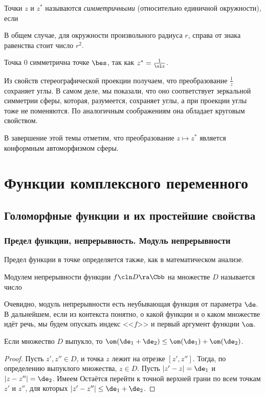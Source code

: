 \documentclass[a4paper]{article}
\begin{document}
\begin{df}
Точки $z$ и $z^*$ называются \emph{симметричными} (относительно единичной окружности),
если
\end{df}

В общем случае, для окружности произвольного радиуса $r$, справа от знака равенства стоит число $r^2$.

Точка $0$ симметрична точке $\bes$, так как $z^* = \frac{1}{\ol z}$.

Из свойств стереографической проекции получаем, что преобразование $\frac{1}{z}$ сохраняет углы. В самом деле,
мы показали, что оно соответствует зеркальной симметрии сферы, которая, разумеется, сохраняет углы, а при проекции углы
тоже не поменяются. По аналогичным соображениям она обладает круговым свойством.

В завершение этой темы отметим, что преобразование $z\mapsto z^*$ является конформным автоморфизмом сферы.

\section{Функции комплексного переменного}

\subsection{Голоморфные функции и их простейшие свойства}

\subsubsection{Предел функции, непрерывность. Модуль непрерывности}

Предел функции в точке определяется также, как в математическом анализе.

\begin{df}
Модулем непрерывности функции $f\cln D\ra \Cbb$ на множестве $D$ называется число
\end{df}

Очевидно, модуль непрерывности есть неубывающая функция от параметра $\de$.
В дальнейшем, если из контекста понятно, о какой функции и о каком множестве идёт речь,
мы будем опускать индекс <<$f$>> и первый аргумент функции $\om$.

\begin{stm}
Если множество $D$ выпукло, то $\om(\de_1+\de_2) \le \om(\de_1)+\om(\de_2)$.
\end{stm}
\begin{proof}
Пусть $z',z''\in D$, и точка $z$ лежит на отрезке $[z',z'']$. Тогда, по определению выпуклого
множества, $z\in D$. Пусть $|z'-z|=\de_1$ и $|z-z''|=\de_2$. Имеем
Остаётся перейти к точной верхней грани по всем точкам $z'$ и $z''$, для которых $|z'-z''|\le \de_1+\de_2$.
\end{proof}
\end{document}
